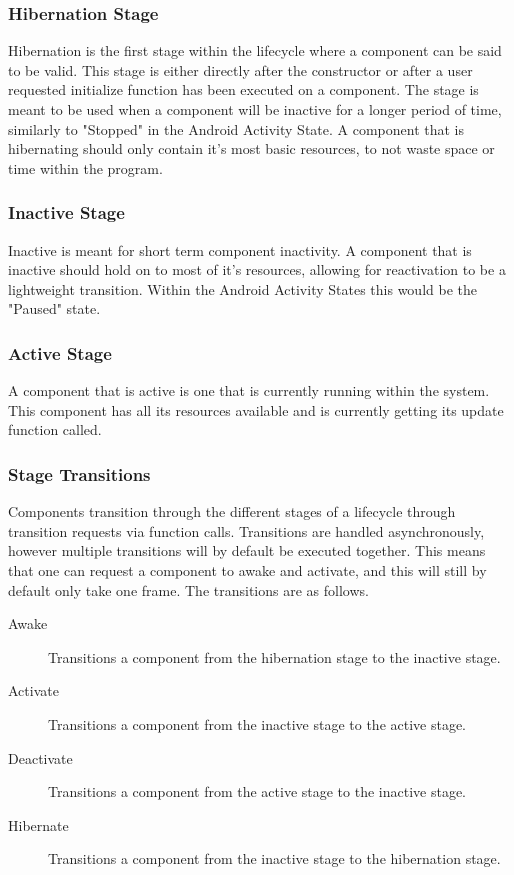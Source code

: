 \subsubsection{Hibernation Stage}
Hibernation is the first stage within the lifecycle where a component can be said to be valid.
This stage is either directly after the constructor or after a user requested initialize function has been executed on a component.
The stage is meant to be used when a component will be inactive for a longer period of time, similarly to "Stopped" in the Android Activity State\cite[Activity state and ejection from memory]{android_activity_lifecycle}.
A component that is hibernating should only contain it's most basic resources, to not waste space or time within the program.

\subsubsection{Inactive Stage}
Inactive is meant for short term component inactivity.
A component that is inactive should hold on to most of it's resources, allowing for reactivation to be a lightweight transition.
Within the Android Activity States this would be the "Paused" state\cite[Activity state and ejection from memory]{android_activity_lifecycle}.

\subsubsection{Active Stage}
A component that is active is one that is currently running within the system.
This component has all its resources available and is currently getting its update function called.

\subsubsection{Stage Transitions}
Components transition through the different stages of a lifecycle through transition requests via function calls.
Transitions are handled asynchronously, however multiple transitions will by default be executed together.
This means that one can request a component to awake and activate, and this will still by default only take one frame.
The transitions are as follows.
\begin{description}
    \item
    [Awake] Transitions a component from the hibernation stage to the inactive stage.

    \item
    [Activate] Transitions a component from the inactive stage to the active stage.

    \item
    [Deactivate] Transitions a component from the active stage to the inactive stage.

    \item
    [Hibernate] Transitions a component from the inactive stage to the hibernation stage.
\end{description}

